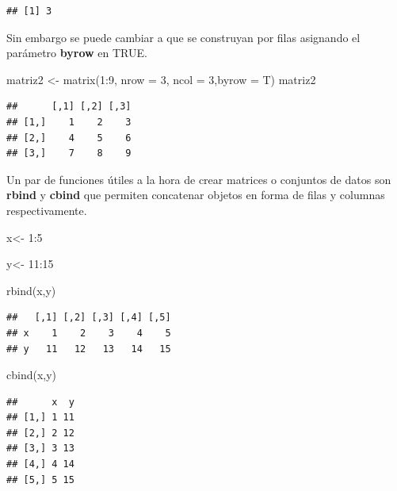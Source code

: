 \documentclass[
  12pt,
]{book}
\newenvironment{Shaded}{\begin{snugshade}}{\end{snugshade}}
\newcommand{\AttributeTok}[1]{\textcolor[rgb]{0.77,0.63,0.00}{#1}}
\newcommand{\DecValTok}[1]{\textcolor[rgb]{0.00,0.00,0.81}{#1}}
\newcommand{\FunctionTok}[1]{\textcolor[rgb]{0.00,0.00,0.00}{#1}}
\newcommand{\NormalTok}[1]{#1}
\newcommand{\OtherTok}[1]{\textcolor[rgb]{0.56,0.35,0.01}{#1}}
\newcommand{\SpecialCharTok}[1]{\textcolor[rgb]{0.00,0.00,0.00}{#1}}
\begin{document}
\begin{verbatim}
## [1] 3
\end{verbatim}

Sin embargo se puede cambiar a que se construyan por filas asignando el parámetro \textbf{byrow} en TRUE.

\begin{Shaded}
\begin{Highlighting}[]
\NormalTok{matriz2 }\OtherTok{\textless{}{-}} \FunctionTok{matrix}\NormalTok{(}\DecValTok{1}\SpecialCharTok{:}\DecValTok{9}\NormalTok{, }\AttributeTok{nrow =} \DecValTok{3}\NormalTok{, }\AttributeTok{ncol =} \DecValTok{3}\NormalTok{,}\AttributeTok{byrow =}\NormalTok{ T)}
\NormalTok{matriz2}
\end{Highlighting}
\end{Shaded}

\begin{verbatim}
##      [,1] [,2] [,3]
## [1,]    1    2    3
## [2,]    4    5    6
## [3,]    7    8    9
\end{verbatim}

Un par de funciones útiles a la hora de crear matrices o conjuntos de datos son \textbf{rbind} y \textbf{cbind} que permiten concatenar objetos en forma de filas y columnas respectivamente.

\begin{Shaded}
\begin{Highlighting}[]
\NormalTok{x}\OtherTok{\textless{}{-}} \DecValTok{1}\SpecialCharTok{:}\DecValTok{5}

\NormalTok{y}\OtherTok{\textless{}{-}} \DecValTok{11}\SpecialCharTok{:}\DecValTok{15}

\FunctionTok{rbind}\NormalTok{(x,y)}
\end{Highlighting}
\end{Shaded}

\begin{verbatim}
##   [,1] [,2] [,3] [,4] [,5]
## x    1    2    3    4    5
## y   11   12   13   14   15
\end{verbatim}

\begin{Shaded}
\begin{Highlighting}[]
\FunctionTok{cbind}\NormalTok{(x,y)}
\end{Highlighting}
\end{Shaded}

\begin{verbatim}
##      x  y
## [1,] 1 11
## [2,] 2 12
## [3,] 3 13
## [4,] 4 14
## [5,] 5 15
\end{verbatim}
\end{document}

